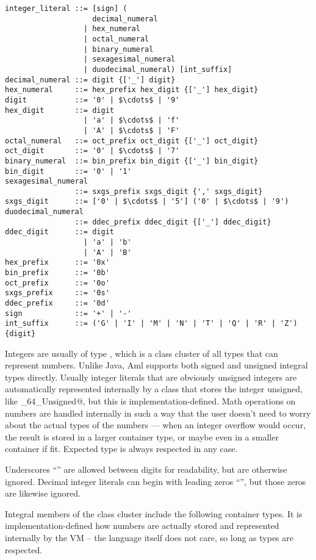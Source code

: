 \syntax\begin{lstlisting}
integer_literal ::= [sign] (
                    decimal_numeral
                  | hex_numeral
                  | octal_numeral
                  | binary_numeral
                  | sexagesimal_numeral
                  | duodecimal_numeral) [int_suffix]
decimal_numeral ::= digit {['_'] digit}
hex_numeral     ::= hex_prefix hex_digit {['_'] hex_digit}
digit           ::= '0' | $\cdots$ | '9'
hex_digit       ::= digit 
                  | 'a' | $\cdots$ | 'f'
                  | 'A' | $\cdots$ | 'F'
octal_numeral   ::= oct_prefix oct_digit {['_'] oct_digit}
oct_digit       ::= '0' | $\cdots$ | '7'
binary_numeral  ::= bin_prefix bin_digit {['_'] bin_digit}
bin_digit       ::= '0' | '1'
sexagesimal_numeral
                ::= sxgs_prefix sxgs_digit {',' sxgs_digit}
sxgs_digit      ::= ['0' | $\cdots$ | '5'] ('0' | $\cdots$ | '9')
duodecimal_numeral
                ::= ddec_prefix ddec_digit {['_'] ddec_digit}
ddec_digit      ::= digit 
                  | 'a' | 'b'
                  | 'A' | 'B'
hex_prefix      ::= '0x'
bin_prefix      ::= '0b'
oct_prefix      ::= '0o'
sxgs_prefix     ::= '0s'
ddec_prefix     ::= '0d'
sign            ::= '+' | '-'
int_suffix      ::= ('G' | 'I' | 'M' | 'N' | 'T' | 'Q' | 'R' | 'Z') {digit}
\end{lstlisting}

Integers are usually of type \lstinline@Number@, which is a class cluster of all types that can represent numbers. Unlike Java, Aml supports both signed and unsigned integral types directly. Usually integer literals that are obviously unsigned integers are automatically represented internally by a class that stores the integer unsigned, like \lstinline@Integer_64_Unsigned@, but this is implementation-defined. Math operations on numbers are handled internally in such a way that the user doesn't need to worry about the actual types of the numbers — when an integer overflow would occur, the result is stored in a larger container type, or maybe even in a smaller container if fit. Expected type is always respected in any case. 

Underscores ``\code{_}'' are allowed between digits for readability, but are otherwise ignored. Decimal integer literals can begin with leading zeros ``'', but those zeros are likewise ignored. 

Integral members of the \lstinline@Number@ class cluster include the following container types. It is implementation-defined how numbers are actually stored and represented internally by the VM -- the language itself does not care, so long as types are respected. 

